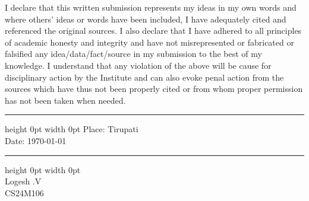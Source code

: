 \declaration

\vspace*{0.5in}

I declare that this written submission represents my ideas in my own words and where
others' ideas or words have been included, I have adequately cited and referenced the original
sources. I also declare that I have adhered to all principles of academic honesty and integrity
and have not misrepresented or fabricated or falsified any idea/data/fact/source in my
submission to the best of my knowledge. I understand that any violation of the above will be cause for disciplinary action
by the Institute and can also evoke penal action from the sources which have thus not been
properly cited or from whom proper permission has not been taken when needed.

\vspace*{1.5in}

\begin{singlespacing}
	\parbox[t]{4cm}{\hrule height 0pt width 0pt
	\noindent Place: Tirupati\\
	\noindent Date: \today \\	
}
\hfill
	\parbox[t]{5cm}{\hrule height 0pt width 0pt
	 \\
	\noindent Logesh .V \\ 
	\noindent CS24M106\\
}
\end{singlespacing}




